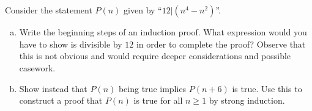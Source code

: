 \documentclass{article}
\begin{document}
\newpage

\section{}
    Consider the statement $P(n)$ given by ``$12|(n^4-n^2)$''.
    \begin{enumerate}[(a)]
        \item Write the beginning steps of an induction proof.
        What expression would you have to show is divisible by $12$ in order to complete the proof?
        Observe that this is not obvious and would require deeper considerations and possible casework.
        \item Show instead that $P(n)$ being true implies $P(n+6)$ is true.
        Use this to construct a proof that $P(n)$ is true for all $n\ge1$ by strong induction.
    \end{enumerate}
    
\end{document}
